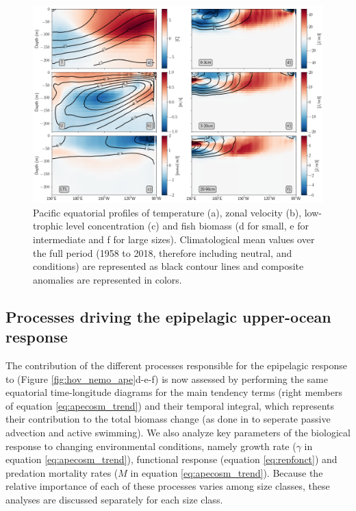 \begin{figure}[h!tp]
	\centering
	\includegraphics[scale=0.4]{figs/forage_mean_ond97.png}	
	\caption{Pacific equatorial profiles of temperature (a), zonal velocity (b), low-trophic level concentration (c) and fish biomass (d for small, e for intermediate and f for large sizes). Climatological mean values over the full period  (1958 to 2018, therefore including neutral, \nino{} and \nina{} conditions) are represented as black contour lines and \nino{} composite anomalies are represented in colors.}	
	\label{fig:profiles}
\end{figure}

\subsection{Processes driving the epipelagic upper-ocean response}

The contribution of the different processes responsible for the epipelagic response to \nino{} (Figure \ref{fig:hov_nemo_ape}d-e-f) is now assessed by performing the same equatorial time-longitude diagrams for the main tendency terms (right members of equation \ref{eq:apecosm_trend}) and their temporal integral, which represents their contribution to the total biomass change (as done in \citealt{guietMovementShapesStructure2022} to seperate passive advection and active swimming). We also analyze key parameters of the biological response to changing environmental conditions, namely growth rate ($\gamma$ in equation \ref{eq:apecosm_trend}), functional response (equation \ref{eq:repfonct}) and predation mortality rates ($M$ in equation \ref{eq:apecosm_trend}). Because the relative importance of each of these processes varies among size classes, these analyses are discussed separately for each size class. 

